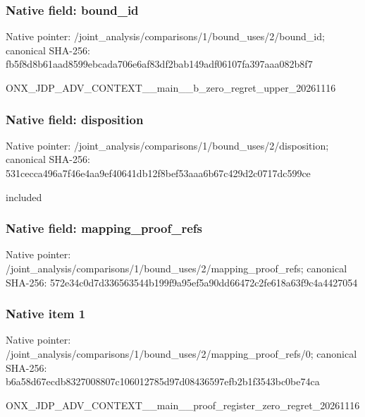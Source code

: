 \documentclass[10pt,a4paper]{article}
\begin{document}
\subsubsection{Native field: bound\_\allowbreak{}id}
Native pointer: /joint\_\allowbreak{}analysis/comparisons/1/bound\_\allowbreak{}uses/2/bound\_\allowbreak{}id; canonical SHA-256: fb5f8d8b61aad8599ebcada706e6af83df2bab149adf06107fa397aaa082b8f7

\begingroup\raggedright\sloppy ONX\_\allowbreak{}JDP\_\allowbreak{}ADV\_\allowbreak{}CONTEXT\_\allowbreak{}\_\allowbreak{}main\_\allowbreak{}\_\allowbreak{}b\_\allowbreak{}zero\_\allowbreak{}regret\_\allowbreak{}upper\_\allowbreak{}20261116\par\endgroup

\subsubsection{Native field: disposition}
Native pointer: /joint\_\allowbreak{}analysis/comparisons/1/bound\_\allowbreak{}uses/2/disposition; canonical SHA-256: 531cecca496a7f46e4aa9ef40641db12f8bef53aaa6b67c429d2c0717dc599ce

\begingroup\raggedright\sloppy included\par\endgroup

\subsubsection{Native field: mapping\_\allowbreak{}proof\_\allowbreak{}refs}
Native pointer: /joint\_\allowbreak{}analysis/comparisons/1/bound\_\allowbreak{}uses/2/mapping\_\allowbreak{}proof\_\allowbreak{}refs; canonical SHA-256: 572e34c0d7d336563544b199f9a95ef5a90dd66472c2fe618a63f9c4a4427054

\subsubsection{Native item 1}
Native pointer: /joint\_\allowbreak{}analysis/comparisons/1/bound\_\allowbreak{}uses/2/mapping\_\allowbreak{}proof\_\allowbreak{}refs/0; canonical SHA-256: b6a58d67ecdb8327008807c106012785d97d08436597efb2b1f3543bc0be74ca

\begingroup\raggedright\sloppy ONX\_\allowbreak{}JDP\_\allowbreak{}ADV\_\allowbreak{}CONTEXT\_\allowbreak{}\_\allowbreak{}main\_\allowbreak{}\_\allowbreak{}proof\_\allowbreak{}register\_\allowbreak{}zero\_\allowbreak{}regret\_\allowbreak{}20261116\par\endgroup
\end{document}
